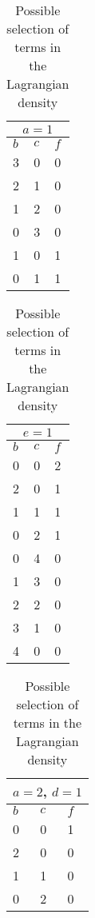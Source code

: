 \begin{table}[t]
  \caption{Possible selection of terms in the Lagrangian density}
  \label{tab:a1}
  \begin{tabular}{|p{}p{}p{}|}
    \hline
    \multicolumn{3}{|c|}{$a=1$} \\
    \hline
    $b$ & $c$ & $f$ \\
    \hline
    3 & 0 & 0 \\
    2 & 1 & 0 \\
    1 & 2 & 0 \\
    0 & 3 & 0 \\
    1 & 0 & 1 \\
    0 & 1 & 1 \\
    \hline
  \end{tabular}
\end{table}

\begin{table}[t]
  \caption{Possible selection of terms in the Lagrangian density}
  \label{tab:e1} 
  \begin{tabular}{|p{}p{}p{}|}
    \hline
    \multicolumn{3}{|c|}{$e=1$} \\
    \hline
    $b$ & $c$ & $f$ \\
    \hline
    0 & 0 & 2 \\
    2 & 0 & 1 \\
    1 & 1 & 1 \\
    0 & 2 & 1 \\
    0 & 4 & 0 \\
    1 & 3 & 0 \\
    2 & 2 & 0 \\
    3 & 1 & 0 \\
    4 & 0 & 0 \\
    \hline
  \end{tabular}
\end{table}

\begin{table}[t]
  \caption{Possible selection of terms in the Lagrangian density}
  \label{tab:a2}  
  \begin{tabular}{|p{}p{}p{}|}
    \hline
    \multicolumn{3}{|c|}{$a=2$, $d=1$} \\
    \hline
    $b$ & $c$ & $f$ \\
    \hline
    0 & 0 & 1 \\
    2 & 0 & 0 \\
    1 & 1 & 0 \\
    0 & 2 & 0 \\
    \hline
  \end{tabular}
\end{table}


